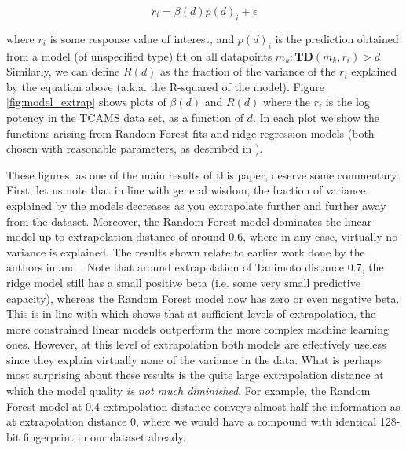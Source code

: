 \documentclass[journal=jacsat,manuscript=article]{achemso}
\begin{document}
\begin{equation}
    r_{i} = \beta(d) p(d)_{i} + \epsilon
\end{equation}

where $r_{i}$ is some response value of interest, and $p(d)_{i}$ is the prediction obtained from a model (of unspecified type) fit on all datapoints $m_{k} : \mathbf{TD}(m_{k}, r_{i}) > d$
\newline
\newline
Similarly, we can define $R(d)$ as the fraction of the variance  of the $r_{i}$ explained by the equation above  (a.k.a. the R-squared of the model).
\newline
\newline
Figure \ref{fig:model_extrap} shows plots of $\beta(d)$ and $R(d)$ where the $r_{i}$ is the log potency in the TCAMS data set, as a function of $d$.  In each plot we show the functions arising from Random-Forest fits and ridge regression models (both chosen with reasonable parameters, as described in \citep{et1:}).




These figures, as one of the main results of this paper, deserve some commentary. First, let us note that in line with general wisdom, the fraction of variance explained by the models decreases as you extrapolate further and further away from the dataset.  Moreover, the Random Forest model dominates the linear model up to extrapolation distance of around 0.6, where in any case, virtually no variance is explained.
\newline
\newline
The results shown relate to earlier work done by the authors in \citep{et0:} and \citep{et1:}.  Note that around extrapolation of Tanimoto distance 0.7, the ridge model still has a small positive beta (i.e. some very small predictive capacity), whereas the Random Forest model now has zero or even negative beta.  This is in line with \citep{et1:} which shows that at sufficient levels of extrapolation, the more constrained linear models outperform the more complex machine learning ones.  However, at this level of extrapolation both models are effectively useless since they explain virtually none of the variance in the data.  
\newline
\newline
What is perhaps most surprising about these results is the quite large extrapolation distance at which the model quality \textit{is not much diminished}.  For example, the Random Forest model at 0.4 extrapolation distance conveys almost half the information as at extrapolation distance 0, where we would have a compound with identical 128-bit fingerprint in our dataset already.
\end{document}
